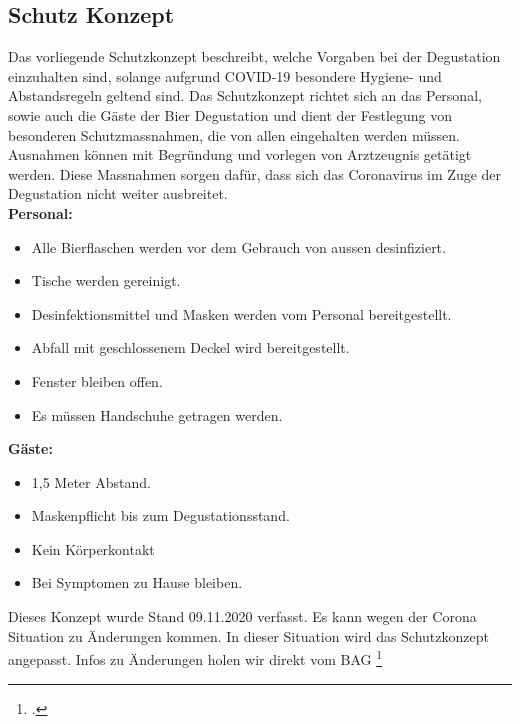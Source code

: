 \subsection{Schutz Konzept}
Das vorliegende Schutzkonzept beschreibt, welche Vorgaben bei der Degustation einzuhalten sind, solange aufgrund COVID-19 besondere Hygiene- und Abstandsregeln geltend sind. Das Schutzkonzept richtet sich an das Personal, sowie auch die Gäste der Bier Degustation und dient der Festlegung von besonderen Schutzmassnahmen, die von allen eingehalten werden müssen. Ausnahmen können mit Begründung und vorlegen von Arztzeugnis getätigt werden.
Diese Massnahmen sorgen dafür, dass sich das Coronavirus im Zuge der Degustation nicht weiter ausbreitet. 
\\
\textbf{Personal:}
\begin{itemize}
    \item Alle Bierflaschen werden vor dem Gebrauch von aussen desinfiziert.
    \item Tische werden gereinigt.
    \item Desinfektionsmittel und Masken werden vom Personal bereitgestellt.
    \item Abfall mit geschlossenem Deckel wird bereitgestellt.
    \item Fenster bleiben offen.
    \item Es müssen Handschuhe getragen werden.
\end{itemize}


\textbf{Gäste:}

\begin{itemize}
    \item 1,5 Meter Abstand.
    \item Maskenpflicht bis zum Degustationsstand.
    \item Kein Körperkontakt
    \item Bei Symptomen zu Hause bleiben.
\end{itemize}

Dieses Konzept wurde Stand 09.11.2020 verfasst.
Es kann wegen der Corona Situation zu Änderungen kommen. In dieser Situation wird das Schutzkonzept angepasst.
Infos zu Änderungen holen wir direkt vom BAG \footcite[Bundesamt für Gesundheit BAG]{bag.admin}

